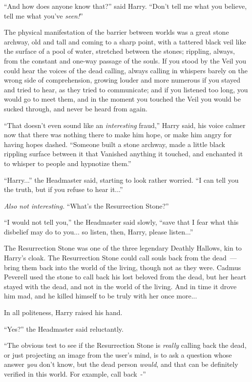 ``And how does anyone know that?'' said Harry. ``Don't tell me what you believe, tell me what you've \emph{seen!}''

The physical manifestation of the barrier between worlds was a great stone archway, old and tall and coming to a sharp point, with a tattered black veil like the surface of a pool of water, stretched between the stones; rippling, always, from the constant and one-way passage of the souls. If you stood by the Veil you could hear the voices of the dead calling, always calling in whispers barely on the wrong side of comprehension, growing louder and more numerous if you stayed and tried to hear, as they tried to communicate; and if you listened too long, you would go to meet them, and in the moment you touched the Veil you would be sucked through, and never be heard from again.

``That doesn't even sound like an \emph{interesting} fraud,'' Harry said, his voice calmer now that there was nothing there to make him hope, or make him angry for having hopes dashed. ``Someone built a stone archway, made a little black rippling surface between it that Vanished anything it touched, and enchanted it to whisper to people and hypnotize them.''

``Harry...'' the Headmaster said, starting to look rather worried. ``I can tell you the truth, but if you refuse to hear it...''

\emph{Also not interesting.} ``What's the Resurrection Stone?''

``I would not tell you,'' the Headmaster said slowly, ``save that I fear what this disbelief may do to you... so listen, then, Harry, please listen...''

The Resurrection Stone was one of the three legendary Deathly Hallows, kin to Harry's cloak. The Resurrection Stone could call souls back from the dead~--- bring them back into the world of the living, though not as they were. Cadmus Peverell used the stone to call back his lost beloved from the dead, but her heart stayed with the dead, and not in the world of the living. And in time it drove him mad, and he killed himself to be truly with her once more...

In all politeness, Harry raised his hand.

``Yes?'' the Headmaster said reluctantly.

``The obvious test to see if the Resurrection Stone is \emph{really} calling back the dead, or just projecting an image from the user's mind, is to ask a question whose answer \emph{you} don't know, but the dead person \emph{would}, and that can be definitely verified in this world. For example, call back~-''

